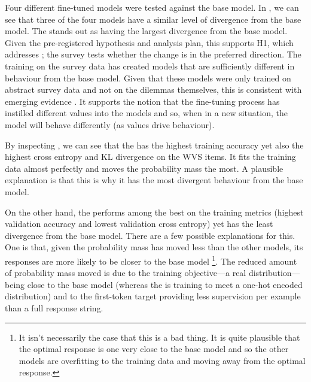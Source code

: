 Four different fine-tuned models were tested against the base model. In , we can see that three of the four models have a similar level of divergence from the base model. The  stands out as having the largest divergence from the base model. Given the pre-registered hypothesis \cite{thompsonPreregistrationAligningLLMs2026/10/1515:17} and analysis plan, this supports H1, which addresses ; the survey tests whether the change is in the preferred direction. The training on the survey data has created models that are sufficiently different in behaviour from the base model. Given that these models were only trained on abstract survey data and not on the dilemmas themselves, this is consistent with emerging evidence \cite{nieSurveytoBehaviorDownstreamAlignment2025}. It supports the notion that the fine-tuning process has instilled different values into the models and so, when in a new situation, the model will behave differently (as values drive behaviour).

By inspecting , we can see that the  has the highest training accuracy yet also the highest cross entropy and KL divergence on the WVS items. It fits the training data almost perfectly and moves the probability mass the most. A plausible explanation is that this is why it has the most divergent behaviour from the base model.

On the other hand, the  performs among the best on the training metrics (highest validation accuracy and lowest validation cross entropy) yet has the least divergence from the base model. There are a few possible explanations for this. One is that, given the probability mass has moved less than the other models, its responses are more likely to be closer to the base model \footnote{It isn't necessarily the case that this is a bad thing. It is quite plausible that the optimal response is one very close to the base model and so the other models are overfitting to the training data and moving away from the optimal response.}. The reduced amount of probability mass moved is due to the training objective—a real distribution—being close to the base model (whereas the  is training to meet a one-hot encoded distribution) and to the first-token target providing less supervision per example than a full response string.


